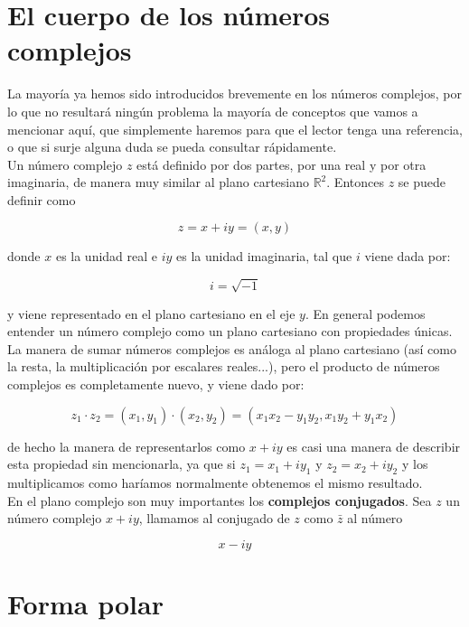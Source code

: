 \documentclass[12pt]{book}
\begin{document}
\section{El cuerpo de los números complejos}

La mayoría ya hemos sido introducidos brevemente en los números complejos, por lo que no resultará ningún problema la mayoría de conceptos que vamos a mencionar aquí, que simplemente haremos para que el lector tenga una referencia, o que si surje alguna duda se pueda consultar rápidamente. \\

Un número complejo $z$ está definido por dos partes, por una real y por otra imaginaria, de manera muy similar al plano cartesiano $\mathbb{R}^2$. Entonces $z$ se puede definir como

\begin{equation}
z  =x + iy = (x,y)
\end{equation}

donde $x$ es la unidad real e  $i y$ es la unidad imaginaria, tal que $i$ viene dada por:

\begin{equation}
i = \sqrt{-1}
\end{equation}

y viene representado en el plano cartesiano en el eje $y$. En general podemos entender un número complejo como un plano cartesiano con propiedades únicas. La manera de sumar números complejos es análoga al plano cartesiano (así como la resta, la multiplicación por escalares reales...), pero el producto de números complejos es completamente nuevo, y viene dado por:

\begin{equation}
z_1 \cdot z_2 = (x_1,y_1) \cdot (x_2,y_2) = (x_1 x_2 - y_1 y_2, x_1 y_2 + y_1 x_2)
\end{equation}

de hecho la manera de representarlos como $x+iy$ es casi una manera de describir esta propiedad sin mencionarla, ya que si $z_1 = x_1+ i y_1$ y $z_2 = x_2 + i y_2$ y los multiplicamos como haríamos normalmente obtenemos el mismo resultado. \\

En el plano complejo son muy importantes los \textbf{complejos conjugados}. Sea $z$ un número complejo $x+iy$, llamamos al conjugado de $z$ como $\bar{z}$ al número

$$ x -iy $$

\section{Forma polar}
\end{document}
